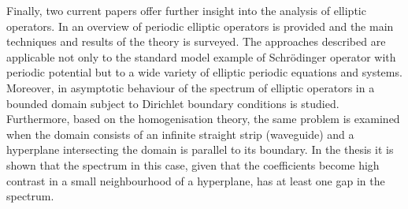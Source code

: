 Finally, two current papers offer further insight into the analysis of elliptic operators. In \cite{kuchment2016overview} an overview of periodic elliptic operators is provided and the main techniques and results of the theory is surveyed. The approaches described are applicable not only to the standard model example of Schrödinger operator with periodic potential but to a wide variety of elliptic periodic equations and systems. Moreover, in \cite{khrabustovskyi2016spectral} asymptotic behaviour of the spectrum of elliptic operators  in a bounded domain subject to Dirichlet boundary conditions is studied. Furthermore, based on the homogenisation theory, the same problem is examined when the domain consists of an infinite straight strip (waveguide) and a hyperplane intersecting the domain is parallel to its boundary. In the thesis it is shown that the spectrum in this case, given that the coefficients become high contrast in a small neighbourhood of a hyperplane, has at least one gap in the spectrum.
